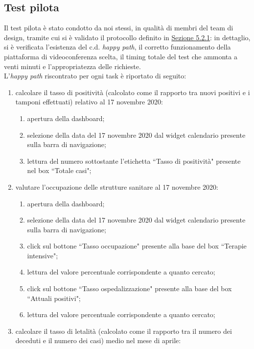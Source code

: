 \subsection{Test pilota}
\label{ss:test-pilota}
Il test pilota è stato condotto da noi stessi, in qualità di membri del team di design, tramite cui si è validato il protocollo definito in \hyperref[ss:vd-progettazione-test]{Sezione 5.2.1}: in dettaglio, si è verificata l'esistenza del c.d. \textit{happy path}, il corretto funzionamento della piattaforma di videoconferenza scelta, il timing totale del test che ammonta a venti minuti e l'appropriatezza delle richieste.\\
L'\textit{happy path} riscontrato per ogni task è riportato di seguito:
\begin{enumerate}
    \item calcolare il tasso di positività (calcolato come il rapporto tra nuovi positivi e i tamponi effettuati) relativo al 17 novembre 2020:
    \begin{enumerate}
        \item apertura della dashboard;
        \item selezione della data del 17 novembre 2020 dal widget calendario presente sulla barra di navigazione;
        \item lettura del numero sottostante l'etichetta ``Tasso di positività" presente nel box ``Totale casi";
    \end{enumerate}
    \item valutare l'occupazione delle strutture sanitare al 17 novembre 2020:
    \begin{enumerate}
        \item apertura della dashboard;
        \item selezione della data del 17 novembre 2020 dal widget calendario presente sulla barra di navigazione;
        \item click sul bottone ``Tasso occupazione" presente alla base del box ``Terapie intensive";
        \item lettura del valore percentuale corrispondente a quanto cercato;
        \item click sul bottone ``Tasso ospedalizzazione" presente alla base del box ``Attuali positivi";
        \item lettura del valore percentuale corrispondente a quanto cercato;
    \end{enumerate}
    \item calcolare il tasso di letalità (calcolato come il rapporto tra il numero dei deceduti e il numero dei casi) medio nel mese di aprile:

\end{enumerate}
